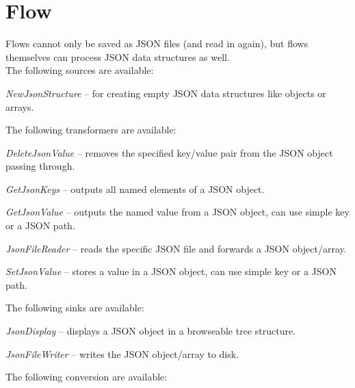 \documentclass[a4paper]{book}
\begin{document}
\chapter{Flow}
Flows cannot only be saved as JSON\cite{json} files (and read in again), but flows
themselves can process JSON data structures as well. \\
The following sources are available:
\begin{tight_itemize}
	\item \textit{NewJsonStructure} -- for creating empty JSON data structures
	like objects or arrays.
\end{tight_itemize}
The following transformers are available:
\begin{tight_itemize}
	\item \textit{DeleteJsonValue} -- removes the specified key/value pair
	from the JSON object passing through.
	\item \textit{GetJsonKeys} -- outputs all named elements
	of a JSON object.
	\item \textit{GetJsonValue} -- outputs the named value
	from a JSON object, can use simple key or a JSON
	path\cite{jsonpath}.
	\item \textit{JsonFileReader} -- reads the specific JSON file and forwards
	a JSON object/array.
	\item \textit{SetJsonValue} -- stores a value in a JSON object, can
	use simple key or a JSON path\cite{jsonpath}.
\end{tight_itemize}
The following sinks are available:
\begin{tight_itemize}
	\item \textit{JsonDisplay} -- displays a JSON object in a browseable
	tree structure.
	\item \textit{JsonFileWriter} -- writes the JSON object/array to disk.
\end{tight_itemize}
The following conversion are available:
\end{document}
